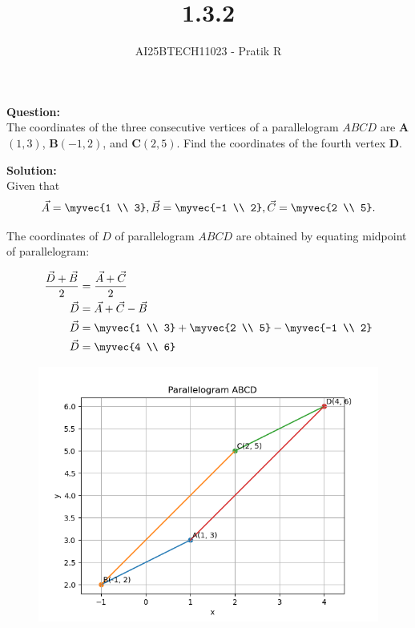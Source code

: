 \documentclass[journal]{IEEEtran}
\begin{document}

\vspace{3cm}

\title{1.3.2}
\author{AI25BTECH11023 - Pratik R
}
{\let\newpage\relax\maketitle}

\renewcommand{\thefigure}{\theenumi}
\renewcommand{\thetable}{\theenumi}
\setlength{\intextsep}{10pt} %


\renewcommand{\thetable}{\theenumi}


\textbf{Question: }\\
The coordinates of the three consecutive vertices of a parallelogram $ABCD$ are
\textbf{A}$(1,3)$, \textbf{B}$(-1,2)$, and \textbf{C}$(2,5)$. Find the coordinates of the fourth vertex \textbf{D}.

\textbf{Solution: } \\
Given that
$$
\vec A = \myvec{1 \\ 3}, \vec B = \myvec{-1 \\ 2}, \vec C = \myvec{2 \\ 5}.
$$

The coordinates of $D$ of parallelogram $ABCD$ are obtained by equating midpoint of parallelogram:  

\begin{align}
\frac{\vec D + \vec B}{2} &= \frac{\vec A + \vec C}{2} \\
\vec D &= \vec A + \vec C - \vec B \\
\vec D &= \myvec{1 \\ 3} + \myvec{2 \\ 5} - \myvec{-1 \\ 2} \\
\vec D &= \myvec{4 \\ 6}
\end{align}

\begin{figure}[h!]
    \centering
    \includegraphics[width=0.7\columnwidth]{figs/fig.png}
    \caption{}
\end{figure}
\end{document}
